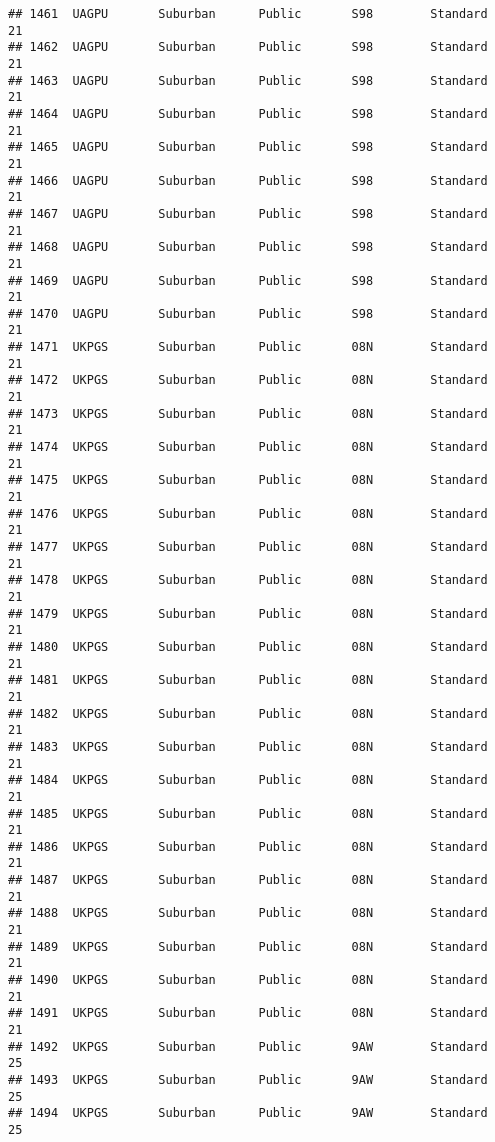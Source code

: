 \documentclass[
]{article}
\begin{document}
\begin{verbatim}
## 1461  UAGPU       Suburban      Public       S98        Standard        21
## 1462  UAGPU       Suburban      Public       S98        Standard        21
## 1463  UAGPU       Suburban      Public       S98        Standard        21
## 1464  UAGPU       Suburban      Public       S98        Standard        21
## 1465  UAGPU       Suburban      Public       S98        Standard        21
## 1466  UAGPU       Suburban      Public       S98        Standard        21
## 1467  UAGPU       Suburban      Public       S98        Standard        21
## 1468  UAGPU       Suburban      Public       S98        Standard        21
## 1469  UAGPU       Suburban      Public       S98        Standard        21
## 1470  UAGPU       Suburban      Public       S98        Standard        21
## 1471  UKPGS       Suburban      Public       08N        Standard        21
## 1472  UKPGS       Suburban      Public       08N        Standard        21
## 1473  UKPGS       Suburban      Public       08N        Standard        21
## 1474  UKPGS       Suburban      Public       08N        Standard        21
## 1475  UKPGS       Suburban      Public       08N        Standard        21
## 1476  UKPGS       Suburban      Public       08N        Standard        21
## 1477  UKPGS       Suburban      Public       08N        Standard        21
## 1478  UKPGS       Suburban      Public       08N        Standard        21
## 1479  UKPGS       Suburban      Public       08N        Standard        21
## 1480  UKPGS       Suburban      Public       08N        Standard        21
## 1481  UKPGS       Suburban      Public       08N        Standard        21
## 1482  UKPGS       Suburban      Public       08N        Standard        21
## 1483  UKPGS       Suburban      Public       08N        Standard        21
## 1484  UKPGS       Suburban      Public       08N        Standard        21
## 1485  UKPGS       Suburban      Public       08N        Standard        21
## 1486  UKPGS       Suburban      Public       08N        Standard        21
## 1487  UKPGS       Suburban      Public       08N        Standard        21
## 1488  UKPGS       Suburban      Public       08N        Standard        21
## 1489  UKPGS       Suburban      Public       08N        Standard        21
## 1490  UKPGS       Suburban      Public       08N        Standard        21
## 1491  UKPGS       Suburban      Public       08N        Standard        21
## 1492  UKPGS       Suburban      Public       9AW        Standard        25
## 1493  UKPGS       Suburban      Public       9AW        Standard        25
## 1494  UKPGS       Suburban      Public       9AW        Standard        25

\end{verbatim}
\end{document}
